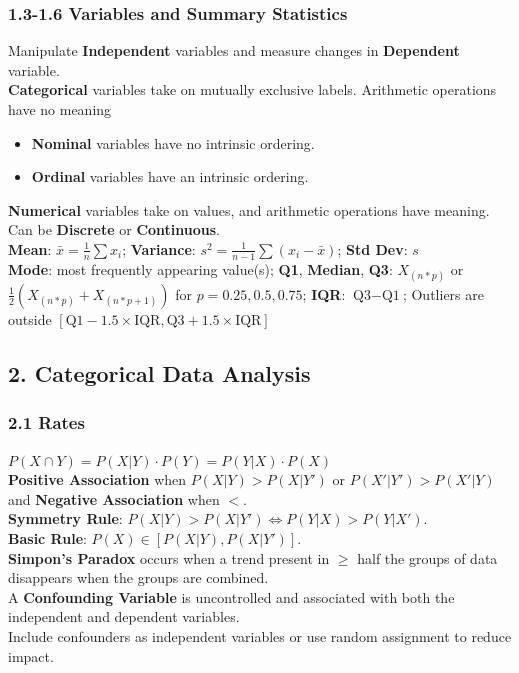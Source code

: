 \begin{multicols*}{3}
\subsubsection{1.3-1.6 Variables and Summary Statistics}
Manipulate \textbf{Independent} variables and measure changes in \textbf{Dependent} variable.\\
\textbf{Categorical} variables take on mutually exclusive labels. Arithmetic operations have no meaning
\begin{itemize}
    \item \textbf{Nominal} variables have no intrinsic ordering.
    \item \textbf{Ordinal} variables have an intrinsic ordering.
\end{itemize}
\textbf{Numerical} variables take on values, and arithmetic operations have meaning. Can be \textbf{Discrete} or \textbf{Continuous}.\\
\textbf{Mean}: $\bar{x}=\frac{1}{n}\sum x_i$; \textbf{Variance}: $s^2=\frac{1}{n-1}\sum(x_i-\bar{x})$; \textbf{Std Dev}: $s$\\
\textbf{Mode}: most frequently appearing value(s); \textbf{Q1}, \textbf{Median}, \textbf{Q3}: $X_{(n*p)}$ or $\frac{1}{2}(X_{(n*p)} + X_{(n*p + 1)})$ for $p=0.25, 0.5, 0.75$; \textbf{IQR}: $\text{Q3}-\text{Q1}$; Outliers are outside $[\text{Q1}- 1.5 \times \text{IQR}, \text{Q3}+ 1.5 \times \text{IQR}]$\\

\subsection{2. Categorical Data Analysis}
\subsubsection{2.1 Rates}
$P(X\cap Y) = P(X|Y)\cdot P(Y)=P(Y|X)\cdot P(X)$\\
\textbf{Positive Association} when $P(X|Y)> P(X|Y')$ or $P(X'|Y')> P(X'|Y)$ and \textbf{Negative Association} when $<$.\\
\textbf{Symmetry Rule}:  $P(X|Y)> P(X|Y') \Leftrightarrow P(Y|X)> P(Y|X')$.\\
\textbf{Basic Rule}: $P(X)\in [P(X|Y), P(X|Y')]$.\\
\textbf{Simpon's Paradox} occurs when a trend present in $\geq$ half the groups of data disappears when the groups are combined.\\
A \textbf{Confounding Variable} is uncontrolled and associated with both the independent and dependent variables.\\
Include confounders as independent variables or use random assignment to reduce impact.


\end{multicols*}
